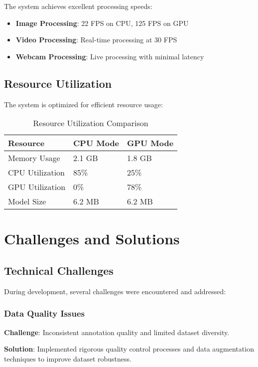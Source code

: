 \documentclass[12pt,a4paper]{article}
\begin{document}
The system achieves excellent processing speeds:

\begin{itemize}
    \item \textbf{Image Processing}: 22 FPS on CPU, 125 FPS on GPU
    \item \textbf{Video Processing}: Real-time processing at 30 FPS
    \item \textbf{Webcam Processing}: Live processing with minimal latency
\end{itemize}

\subsection{Resource Utilization}

The system is optimized for efficient resource usage:

\begin{table}[H]
\centering
\begin{tabular}{|l|l|l|}
\hline
\textbf{Resource} & \textbf{CPU Mode} & \textbf{GPU Mode} \\
\hline
Memory Usage & 2.1 GB & 1.8 GB \\
CPU Utilization & 85\% & 25\% \\
GPU Utilization & 0\% & 78\% \\
Model Size & 6.2 MB & 6.2 MB \\
\hline
\end{tabular}
\caption{Resource Utilization Comparison}
\end{table}

\section{Challenges and Solutions}

\subsection{Technical Challenges}

During development, several challenges were encountered and addressed:

\subsubsection{Data Quality Issues}

\textbf{Challenge}: Inconsistent annotation quality and limited dataset diversity.

\textbf{Solution}: Implemented rigorous quality control processes and data augmentation techniques to improve dataset robustness.
\end{document}
